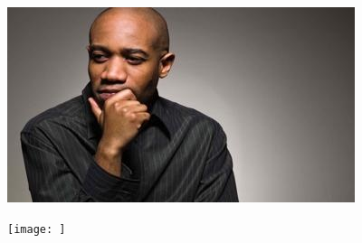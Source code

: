 \begin{itemize}
\begin{figure}[!htb]
\begin{minipage}{0.33\textwidth}
            \end{minipage}\hfill
            \begin{minipage}{0.33\textwidth}
                \centering
                \includegraphics[scale = 0.45]{images/results/detection/30_detections.jpg}
            \end{minipage}\hfill
            \begin{minipage}{0.33\textwidth}
                \centering
                \texttt{[image: ]}
            \end{minipage}
        \end{figure}
\end{itemize} 